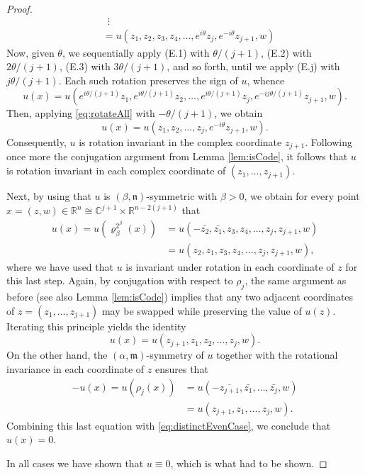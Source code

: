 \documentclass[10pt,a4paper]{amsart}
\newcommand{\CC}{\mathbb{C}}
\newcommand{\RR}{\mathbb{R}}
\newcommand{\m}{\mathfrak{m}}
\newcommand{\n}{\mathfrak{n}}
\begin{document}
\begin{proof}
\begin{align}
			&\,\,\,\vdots\tag*{}\\
			&= u(z_1, z_2, z_{3}, z_4, \dots, e^{i\theta}z_{j}, e^{-i\theta}z_{j+1}, w) \tag{E.j}
		\end{align}
		Now, given $\theta$, we sequentially apply (E.1) with $\theta/(j+1)$, (E.2) with $2\theta/(j+1)$, (E.3)  with $3\theta/(j+1)$, and so forth, until we apply (E.j) with $j\theta/(j+1)$. Each such rotation preserves the sign of $u$, whence
		\[
		u(x) = u(e^{i\theta/(j+1)}z_1, e^{i\theta/(j+1)} z_2, \dots, e^{i\theta/(j+1)} z_{j}, e^{-ij\theta/(j+1)}z_{j+1}, w).
		\]
		Then, applying \eqref{eq:rotateAll} with $-\theta/(j+1)$, we obtain
		\[
		u(x) = u(z_1, z_2, \dots, z_{j}, e^{-i\theta}z_{j+1}, w).
		\]
		Consequently, $u$ is rotation invariant in the complex coordinate $z_{j+1}$. Following once more the conjugation argument from Lemma \ref{lem:isCode}, it follows that $u$ is rotation invariant in each complex coordinate of $(z_1,\dots, z_{j+1})$. 
		
		Next, by using that $u$ is $(\beta,\n)$-symmetric with $\beta > 0$, we obtain for every point $x  = (z,w)\in \RR^n \cong \CC^{j+1} \times \RR^{n-2(j+1)}$ that 
		\begin{align*}
			u(x) = u(\varrho_{\beta}^{2^\beta}(x)) &= u(-\bar{z_2}, \bar{z_1}, z_3, z_4, \dots, z_{j}, z_{j+1}, w)\\
			&= u({z_2}, {z_1}, z_3, z_4, \dots, z_{j}, z_{j+1}, w),
		\end{align*}
		where we have used that $u$ is invariant under rotation in each coordinate of $z$ for this last step. Again, by conjugation with respect to $\rho_j$, the same argument as before (see also Lemma \ref{lem:isCode}) implies that any two adjacent coordinates of $z = (z_1,\dots,z_{j+1})$ may be swapped while preserving the value of $u(z)$. Iterating this principle yields the identity
		\begin{equation}\label{eq:distinctEvenCase}
			u(x) = u(z_{j+1}, z_1, z_2, \dots, z_j, w).
		\end{equation}
		On the other hand, the $(\alpha, \m)$-symmetry of $u$ together with the rotational invariance in each coordinate of $z$ ensures that
		\begin{align*}
			-u(x) = u(\rho_j (x)) &= u(-\overline{z_{j+1}}, \bar{z_1}, \dots, \bar{z_j},w)\\
			&=u(z_{j+1}, z_1, \dots, z_j, w).
		\end{align*}
		Combining this last equation with \eqref{eq:distinctEvenCase}, we conclude that $u(x) = 0$. 
		
		In all cases we have shown that $u \equiv 0$, which is what had to be shown.
	\end{proof}
\end{document}
